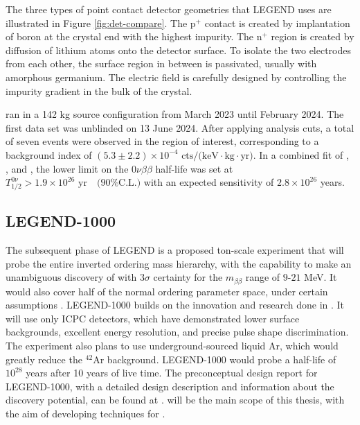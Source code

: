 The three types of point contact detector geometries that LEGEND uses are illustrated in Figure \ref{fig:det-compare}. The p$^+$ contact is created by implantation of boron at the crystal end with the highest impurity. The n$^+$ region is created by diffusion of lithium atoms onto the detector surface. To isolate the two electrodes from each other, the surface region in between is passivated, usually with amorphous germanium. The electric field is carefully designed by controlling the impurity gradient in the bulk of the crystal. 


{\Ltwo} ran in a 142 kg source configuration from March 2023 until February 2024. The first data set was unblinded on 13 June 2024. After applying analysis cuts, a total of seven events were observed in the region of interest, corresponding to a background index of $ (5.3 \pm 2.2) \times 10^{-4} \text{ cts/(keV$\cdot$kg$\cdot$yr)}$. In a combined fit of {\Gerda}, {\MJD}, and {\Ltwo}, the lower limit on the 0$\nu\beta\beta$ half-life was set at $T^{0\nu}_{1/2} > 1.9 \times 10^{26} \text{ yr} \quad \text{(90\% C.L.)}$ with an expected sensitivity of $2.8 \times 10^{26}$ years. \cite{Pertoldi2024}

\subsection{LEGEND-1000}
The subsequent phase of LEGEND is a proposed ton-scale experiment that will probe the entire inverted ordering mass hierarchy, with the capability to make an unambiguous discovery of {\onbb} with $3\sigma$ certainty for the $m_{\beta\beta}$ range of $9$-$21$ MeV. It would also cover half of the normal ordering parameter space, under certain assumptions \cite{l1000_pcdr}. LEGEND-1000 builds on the innovation and research done in {\Ltwo}. It will use only ICPC detectors, which have demonstrated lower surface backgrounds, excellent energy resolution, and precise pulse shape discrimination. The experiment also plans to use underground-sourced liquid Ar, which would greatly reduce the $^{42}$Ar background. LEGEND-1000 would probe a half-life of $10^{28}$ years after 10 years of live time. The preconceptual design report for LEGEND-1000, with a detailed design description and information about the discovery potential, can be found at \cite{l1000_pcdr}. {\Ltwo} will be the main scope of this thesis, with the aim of developing techniques for {\Lthou}.




